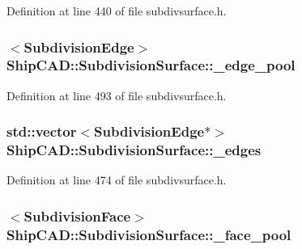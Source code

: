 Definition at line 440 of file subdivsurface.\+h.

\subsubsection[{\texorpdfstring{\+\_\+edge\+\_\+pool}{_edge_pool}}]{$<${\bf Subdivision\+Edge}$>$ Ship\+C\+A\+D\+::\+Subdivision\+Surface\+::\+\_\+edge\+\_\+pool\hspace{0.3cm}{\ttfamily [protected]}}\hypertarget{classShipCAD_1_1SubdivisionSurface_a47d61792772139e74bebfb11eaea21a7}{}\label{classShipCAD_1_1SubdivisionSurface_a47d61792772139e74bebfb11eaea21a7}


Definition at line 493 of file subdivsurface.\+h.

\subsubsection[{\texorpdfstring{\+\_\+edges}{_edges}}]{\setlength{\rightskip}{0pt plus 5cm}std\+::vector$<${\bf Subdivision\+Edge}$\ast$$>$ Ship\+C\+A\+D\+::\+Subdivision\+Surface\+::\+\_\+edges\hspace{0.3cm}{\ttfamily [protected]}}\hypertarget{classShipCAD_1_1SubdivisionSurface_a709c44779394f03c06c16adba6187ecd}{}\label{classShipCAD_1_1SubdivisionSurface_a709c44779394f03c06c16adba6187ecd}


Definition at line 474 of file subdivsurface.\+h.

\subsubsection[{\texorpdfstring{\+\_\+face\+\_\+pool}{_face_pool}}]{$<${\bf Subdivision\+Face}$>$ Ship\+C\+A\+D\+::\+Subdivision\+Surface\+::\+\_\+face\+\_\+pool\hspace{0.3cm}{\ttfamily [protected]}}\hypertarget{classShipCAD_1_1SubdivisionSurface_a6064ab4cdadae400c79c4cbcba906b3a}{}\label{classShipCAD_1_1SubdivisionSurface_a6064ab4cdadae400c79c4cbcba906b3a}



